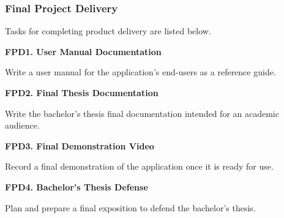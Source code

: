 \subsubsection{Final Project Delivery}

Tasks for completing product delivery are listed below.

\textbf{FPD1. User Manual Documentation}

Write a user manual for the application's end-users as a reference guide.

\textbf{FPD2. Final Thesis Documentation}

Write the bachelor's thesis final documentation intended for an academic audience. 

\textbf{FPD3. Final Demonstration Video}

Record a final demonstration of the application once it is ready for use.

\textbf{FPD4. Bachelor's Thesis Defense}

 Plan and prepare a final exposition to defend the bachelor's thesis.